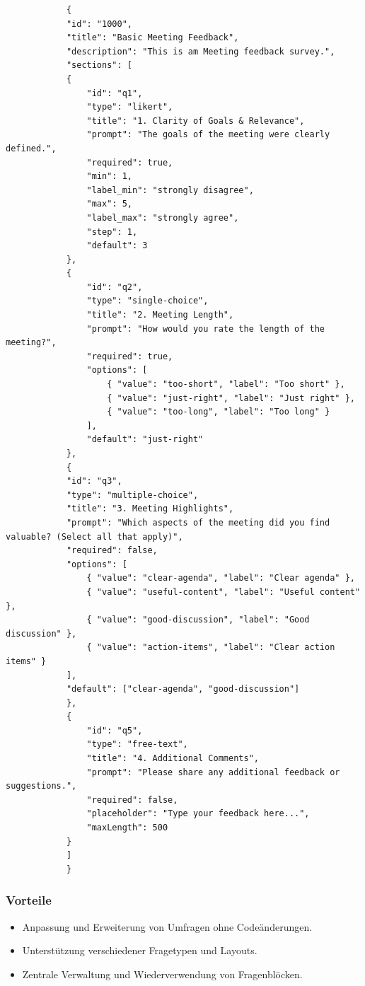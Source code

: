 \documentclass[12pt,a4paper]{report}
\begin{document}
        \begin{verbatim}
            {
            "id": "1000",
            "title": "Basic Meeting Feedback",
            "description": "This is am Meeting feedback survey.",
            "sections": [
            {
                "id": "q1",
                "type": "likert",
                "title": "1. Clarity of Goals & Relevance",
                "prompt": "The goals of the meeting were clearly defined.",
                "required": true,
                "min": 1,
                "label_min": "strongly disagree",
                "max": 5,
                "label_max": "strongly agree",
                "step": 1,
                "default": 3
            },
            {
                "id": "q2",
                "type": "single-choice",
                "title": "2. Meeting Length",
                "prompt": "How would you rate the length of the meeting?",
                "required": true,
                "options": [
                    { "value": "too-short", "label": "Too short" },
                    { "value": "just-right", "label": "Just right" },
                    { "value": "too-long", "label": "Too long" }
                ],
                "default": "just-right"
            },
            {
            "id": "q3",
            "type": "multiple-choice",
            "title": "3. Meeting Highlights",
            "prompt": "Which aspects of the meeting did you find valuable? (Select all that apply)",
            "required": false,
            "options": [
                { "value": "clear-agenda", "label": "Clear agenda" },
                { "value": "useful-content", "label": "Useful content" },
                { "value": "good-discussion", "label": "Good discussion" },
                { "value": "action-items", "label": "Clear action items" }
            ],
            "default": ["clear-agenda", "good-discussion"]
            },
            {
                "id": "q5",
                "type": "free-text",
                "title": "4. Additional Comments",
                "prompt": "Please share any additional feedback or suggestions.",
                "required": false,
                "placeholder": "Type your feedback here...",
                "maxLength": 500
            }
            ]
            }
        \end{verbatim}

    \subsubsection{Vorteile}
        \begin{itemize}
            \item Anpassung und Erweiterung von Umfragen ohne Codeänderungen.
            \item Unterstützung verschiedener Fragetypen und Layouts.
            \item Zentrale Verwaltung und Wiederverwendung von Fragenblöcken.
        \end{itemize}
\end{document}
